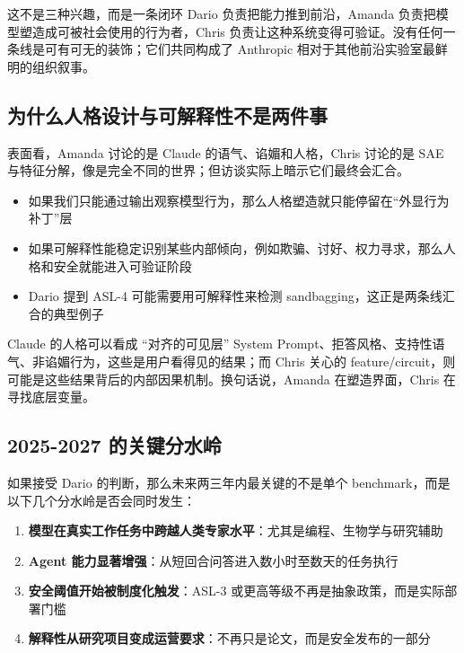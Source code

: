 \documentclass[a4paper]{article}
\begin{document}
\begin{importantbox}{这不是三种兴趣，而是一条闭环}
Dario 负责把能力推到前沿，Amanda 负责把模型塑造成可被社会使用的行为者，Chris 负责让这种系统变得可验证。没有任何一条线是可有可无的装饰；它们共同构成了 Anthropic 相对于其他前沿实验室最鲜明的组织叙事。
\end{importantbox}

\subsection{为什么人格设计与可解释性不是两件事}

表面看，Amanda 讨论的是 Claude 的语气、谄媚和人格，Chris 讨论的是 SAE 与特征分解，像是完全不同的世界；但访谈实际上暗示它们最终会汇合。

\begin{itemize}
    \item 如果我们只能通过输出观察模型行为，那么人格塑造就只能停留在``外显行为补丁''层
    \item 如果可解释性能稳定识别某些内部倾向，例如欺骗、讨好、权力寻求，那么人格和安全就能进入可验证阶段
    \item Dario 提到 ASL-4 可能需要用可解释性来检测 sandbagging，这正是两条线汇合的典型例子
\end{itemize}

\begin{knowledgebox}{Claude 的人格可以看成 ``对齐的可见层''}
System Prompt、拒答风格、支持性语气、非谄媚行为，这些是用户看得见的结果；而 Chris 关心的 feature/circuit，则可能是这些结果背后的内部因果机制。换句话说，Amanda 在塑造界面，Chris 在寻找底层变量。
\end{knowledgebox}

\subsection{2025-2027 的关键分水岭}

如果接受 Dario 的判断，那么未来两三年内最关键的不是单个 benchmark，而是以下几个分水岭是否会同时发生：

\begin{enumerate}
    \item \textbf{模型在真实工作任务中跨越人类专家水平}：尤其是编程、生物学与研究辅助
    \item \textbf{Agent 能力显著增强}：从短回合问答进入数小时至数天的任务执行
    \item \textbf{安全阈值开始被制度化触发}：ASL-3 或更高等级不再是抽象政策，而是实际部署门槛
    \item \textbf{解释性从研究项目变成运营要求}：不再只是论文，而是安全发布的一部分
\end{enumerate}
\end{document}
